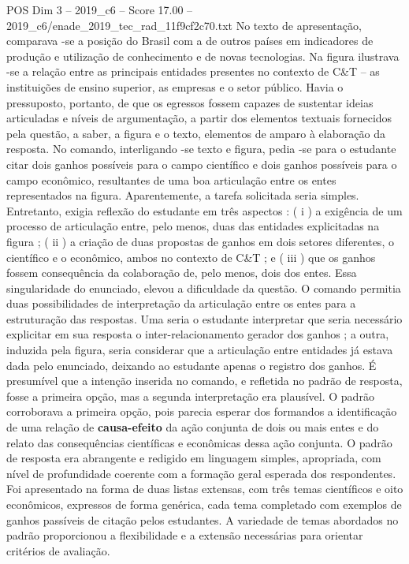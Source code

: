 \begin{textsample}{POS Dim 3 – 2019\_c6 – Score 17.00 – 2019\_c6/enade\_2019\_tec\_rad\_11f9cf2c70.txt}
No texto de apresentação, comparava -se a posição do Brasil com a de outros países em indicadores de produção e utilização de conhecimento e de novas tecnologias.
Na figura ilustrava -se a relação entre as principais entidades presentes no contexto de C\&T – as instituições de ensino superior, as empresas e o setor público.
Havia o pressuposto, portanto, de que os egressos fossem capazes de sustentar ideias articuladas e níveis de argumentação, a partir dos elementos textuais fornecidos pela questão, a saber, a figura e o texto, elementos de amparo à elaboração da resposta.
No comando, interligando -se texto e figura, pedia -se para o estudante citar dois ganhos possíveis para o campo científico e dois ganhos possíveis para o campo econômico, resultantes de uma boa articulação entre os entes representados na figura.
Aparentemente, a tarefa solicitada seria simples.
Entretanto, exigia reflexão do estudante em três aspectos : ( i ) a exigência de um processo de articulação entre, pelo menos, duas das entidades explicitadas na figura ; ( ii ) a criação de duas propostas de ganhos em dois setores diferentes, o científico e o econômico, ambos no contexto de C\&T ; e ( iii ) que os ganhos fossem consequência da colaboração de, pelo menos, dois dos entes.
Essa singularidade do enunciado, elevou a dificuldade da questão.
O comando permitia duas possibilidades de interpretação da articulação entre os entes para a estruturação das respostas.
Uma seria o estudante interpretar que seria necessário explicitar em sua resposta o inter-relacionamento gerador dos ganhos ; a outra, induzida pela figura, seria considerar que a articulação entre entidades já estava dada pelo enunciado, deixando ao estudante apenas o registro dos ganhos.
É presumível que a intenção inserida no comando, e refletida no padrão de resposta, fosse a primeira opção, mas a segunda interpretação era plausível.
O padrão corroborava a primeira opção, pois parecia esperar dos formandos a identificação de uma relação de \textbf{causa-efeito} da ação conjunta de dois ou mais entes e do relato das consequências científicas e econômicas dessa ação conjunta.
O padrão de resposta era abrangente e redigido em linguagem simples, apropriada, com nível de profundidade coerente com a formação geral esperada dos respondentes.
Foi apresentado na forma de duas listas extensas, com três temas científicos e oito econômicos, expressos de forma genérica, cada tema completado com exemplos de ganhos passíveis de citação pelos estudantes.
A variedade de temas abordados no padrão proporcionou a flexibilidade e a extensão necessárias para orientar critérios de avaliação.

\end{textsample}
